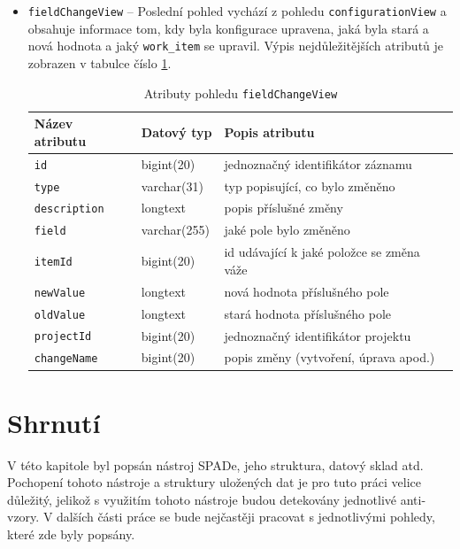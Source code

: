 \documentclass[czech,DP]{thesiskiv}
\begin{document}
\begin{itemize}
    \item \texttt{fieldChangeView} -- Poslední pohled vychází z pohledu \texttt{configurationView} a obsahuje informace tom, kdy byla konfigurace upravena, jaká byla stará a nová hodnota a jaký \texttt{work\_item} se upravil. Výpis nejdůležitějších atributů je zobrazen v tabulce číslo \ref{tab:fieldchangeview}.
    \begin{table}[]
    	\begin{tabular}{|l|l|l|}
    	\hline
    	\textbf{Název atributu} & \textbf{Datový typ} & \textbf{Popis atributu}           \\ \hline \hline
    	\texttt{id}             & bigint(20)          & jednoznačný identifikátor záznamu \\ \hline
    	\texttt{type}           & varchar(31)         & typ popisující, co bylo změněno                              \\ \hline
    	\texttt{description}    & longtext            & popis příslušné změny                              \\ \hline
    	\texttt{field}          & varchar(255)            & jaké pole bylo změněno                              \\ \hline
    	\texttt{itemId}         & bigint(20)          & id udávající k jaké položce se změna váže                              \\ \hline
    	\texttt{newValue}       & longtext            & nová hodnota příslušného pole                              \\ \hline
    	\texttt{oldValue}       & longtext            & stará hodnota příslušného pole                              \\ \hline
    	\texttt{projectId}      & bigint(20)          & jednoznačný identifikátor projektu                              \\ \hline
    	\texttt{changeName}      & bigint(20)          & popis změny (vytvoření, úprava apod.)                              \\ \hline
    	\end{tabular}
        \caption{\label{tab:fieldchangeview}Atributy pohledu \texttt{fieldChangeView}}
    \end{table}
    
\end{itemize}
\newpage
\section{Shrnutí}
V této kapitole byl popsán nástroj SPADe, jeho struktura, datový sklad atd. Pochopení tohoto nástroje a struktury uložených dat je pro tuto práci velice důležitý, jelikož s využitím tohoto nástroje budou detekovány jednotlivé anti-vzory. V dalších části práce se bude nejčastěji pracovat s jednotlivými pohledy, které zde byly popsány.
\end{document}
